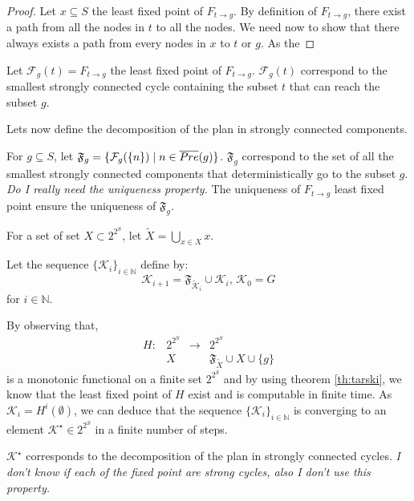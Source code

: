 \begin{proof} 
Let $x \subseteq S$ the least fixed point of $F_{t \rightarrow g}$.
By definition of $F_{t \rightarrow g}$, there exist a path from all the nodes in $t$ to all the nodes.
We need now to show that there always exists a path from every nodes in $x$ to $t$ or $g$.
As the 
\end{proof}

Let $\mathcal{F}_g(t) = F_{t \rightarrow g}$ the least fixed point of $F_{t \rightarrow g}$.
$\mathcal{F}_g(t)$ correspond to the smallest strongly connected cycle containing the subset $t$ that can reach the subset $g$.

Lets now define the decomposition of the plan in strongly connected components.

For $g \subseteq S$, let $\mathfrak{F}_g = \{ \mathcal{F}_g(\{n\}) \mid n \in \overline{Pre} (g) \}$.
$\mathfrak{F}_g$ correspond to the set of all the smallest strongly connected components that deterministically go to the subset $g$.
\textit{Do I really need the uniqueness property.}
The uniqueness of  $F_{t \rightarrow g}$ least fixed point ensure the uniqueness of $\mathfrak{F}_g$.

For a set of set $X \subset 2^{2^S}$, let $\tilde{X} = \bigcup_{x \in X} x$.

Let the sequence $\{\mathcal{K}_i\}_{i \in \mathbb{N}}$ define by:
\begin{equation*}
\mathcal{K}_{i+1}  = \mathfrak{F}_{\tilde{\mathcal{K}}_i} \cup \mathcal{K}_i
\textrm{, }
\mathcal{K}_0 = G
\end{equation*}
for $i \in \mathbb{N}$. 

By observing that,
\begin{equation}
\begin{array}{llll}
H : &2^{2^S} &\rightarrow &2^{2^S}\\
&X & & \mathfrak{F}_{\tilde{X}} \cup X \cup \{ g \}
\end{array}
\end{equation}
is a monotonic functional on a finite set $2^{2^S}$ and by using theorem \ref{th:tarski}, we know that the least fixed point of $H$ exist and is computable in finite time.
As $\mathcal{K}_i = H^i(\emptyset)$, we can deduce that the sequence $\{\mathcal{K}_i\}_{i \in \mathbb{N}}$ is converging to an element $\mathcal{K}^\star \in 2^{2^S}$ in a finite number of steps.

$\mathcal{K}^\star$ corresponds to the decomposition of the plan in strongly connected cycles.
\textit{I don't know if each of the fixed point are strong cycles, also I don't use this property.}

